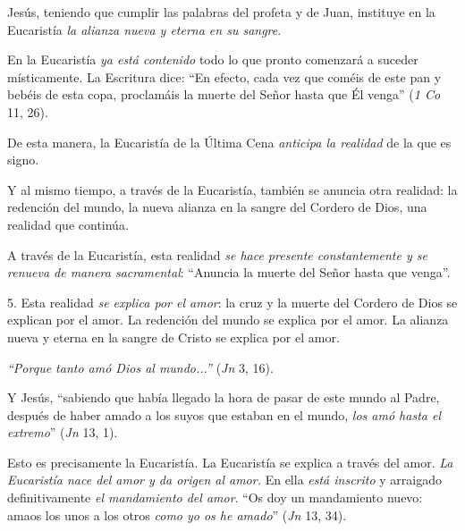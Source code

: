 			\begin{body}Jesús, teniendo que cumplir las palabras del profeta y de Juan, instituye en la Eucaristía \textit{la alianza nueva y eterna en su sangre}. \end{body}
			
			\begin{body}En la Eucaristía \textit{ya está contenido }todo lo que pronto comenzará a suceder místicamente. La Escritura dice: “En efecto, cada vez que coméis de este pan y bebéis de esta copa, proclamáis la muerte del Señor hasta que Él venga” (\textit{1 Co} 11, 26). \end{body}
			
			\begin{body}De esta manera, la Eucaristía de la Última Cena \textit{anticipa la realidad} de la que es signo. \end{body}
			
			\begin{body}Y al mismo tiempo, a través de la Eucaristía, también se anuncia otra realidad: la redención del mundo, la nueva alianza en la sangre del Cordero de Dios, una realidad que continúa. \end{body}
			
			\begin{body}A través de la Eucaristía, esta realidad \textit{se hace presente constantemente y se renueva de manera sacramental}: “Anuncia la muerte del Señor hasta que venga”. \end{body}
			
			\begin{body}5. Esta realidad \textit{se explica por el amor}: la cruz y la muerte del Cordero de Dios se explican por el amor. La redención del mundo se explica por el amor. La alianza nueva y eterna en la sangre de Cristo se explica por el amor. \end{body}
			
			\begin{body}\textit{“Porque tanto amó Dios al mundo...” }(\textit{Jn }3, 16). \end{body}
			
			\begin{body}Y Jesús, “sabiendo que había llegado la hora de pasar de este mundo al Padre, después de haber amado a los suyos que estaban en el mundo, \textit{los amó hasta el extremo}” (\textit{Jn} 13, 1). \end{body}
			
			\begin{body}Esto es precisamente la Eucaristía. La Eucaristía se explica a través del amor. \textit{La Eucaristía nace del amor y da origen al amor. }En ella \textit{está inscrito} y arraigado definitivamente \textit{el mandamiento del amor}. “Os doy un mandamiento nuevo: amaos los unos a los otros \textit{como yo os he amado}” (\textit{Jn} 13, 34).\end{body}
			
